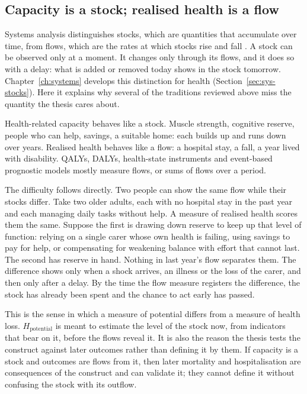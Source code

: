 \subsection{Capacity is a stock; realised health is a flow}

Systems analysis distinguishes stocks, which are quantities that accumulate over time, from flows, which are the rates at which stocks rise and fall \citep{forrester_1961,sterman_2000,meadows_2008}. A stock can be observed only at a moment. It changes only through its flows, and it does so with a delay: what is added or removed today shows in the stock tomorrow. Chapter~\ref{ch:systems} develops this distinction for health (Section~\ref{sec:sys-stocks}). Here it explains why several of the traditions reviewed above miss the quantity the thesis cares about.

Health-related capacity behaves like a stock. Muscle strength, cognitive reserve, people who can help, savings, a suitable home: each builds up and runs down over years. Realised health behaves like a flow: a hospital stay, a fall, a year lived with disability. QALYs, DALYs, health-state instruments and event-based prognostic models mostly measure flows, or sums of flows over a period.

The difficulty follows directly. Two people can show the same flow while their stocks differ. Take two older adults, each with no hospital stay in the past year and each managing daily tasks without help. A measure of realised health scores them the same. Suppose the first is drawing down reserve to keep up that level of function: relying on a single carer whose own health is failing, using savings to pay for help, or compensating for weakening balance with effort that cannot last. The second has reserve in hand. Nothing in last year's flow separates them. The difference shows only when a shock arrives, an illness or the loss of the carer, and then only after a delay. By the time the flow measure registers the difference, the stock has already been spent and the chance to act early has passed.

This is the sense in which a measure of potential differs from a measure of health loss. $H_{\text{potential}}$ is meant to estimate the level of the stock now, from indicators that bear on it, before the flows reveal it. It is also the reason the thesis tests the construct against later outcomes rather than defining it by them. If capacity is a stock and outcomes are flows from it, then later mortality and hospitalisation are consequences of the construct and can validate it; they cannot define it without confusing the stock with its outflow.

